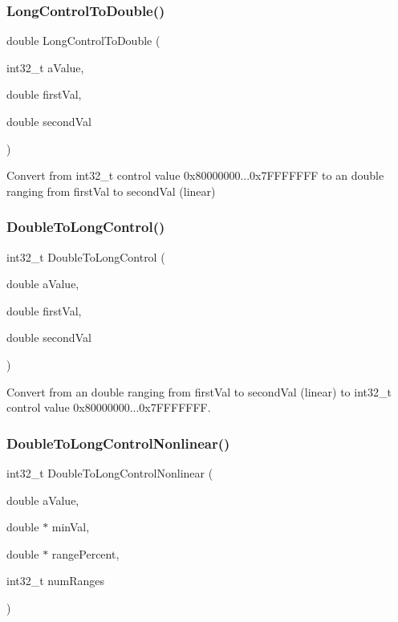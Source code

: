 \subsubsection{\texorpdfstring{LongControlToDouble()}{LongControlToDouble()}}
{\footnotesize\ttfamily double Long\+Control\+To\+Double (\begin{DoxyParamCaption}\item[{int32\+\_\+t}]{a\+Value,  }\item[{double}]{first\+Val,  }\item[{double}]{second\+Val }\end{DoxyParamCaption})}



Convert from int32\+\_\+t control value 0x80000000...0x7\+F\+F\+F\+F\+F\+FF to an double ranging from first\+Val to second\+Val (linear) 

\mbox{\label{a00674_a285ce2bf578a7ceb8c12eabbd5e5ad37}} 
\subsubsection{\texorpdfstring{DoubleToLongControl()}{DoubleToLongControl()}}
{\footnotesize\ttfamily int32\+\_\+t Double\+To\+Long\+Control (\begin{DoxyParamCaption}\item[{double}]{a\+Value,  }\item[{double}]{first\+Val,  }\item[{double}]{second\+Val }\end{DoxyParamCaption})}



Convert from an double ranging from first\+Val to second\+Val (linear) to int32\+\_\+t control value 0x80000000...0x7\+F\+F\+F\+F\+F\+FF. 

\mbox{\label{a00674_a76082aa640489b279cd7683c12fcbd33}} 
\subsubsection{\texorpdfstring{DoubleToLongControlNonlinear()}{DoubleToLongControlNonlinear()}}
{\footnotesize\ttfamily int32\+\_\+t Double\+To\+Long\+Control\+Nonlinear (\begin{DoxyParamCaption}\item[{double}]{a\+Value,  }\item[{double $\ast$}]{min\+Val,  }\item[{double $\ast$}]{range\+Percent,  }\item[{int32\+\_\+t}]{num\+Ranges }\end{DoxyParamCaption})}

